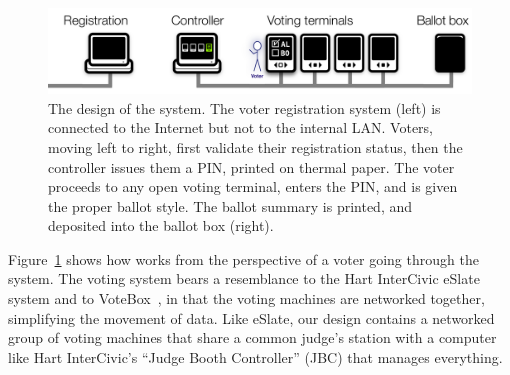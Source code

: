 \label{sec:voterflow}

\begin{figure}
\includegraphics[width=5.5in]{system-layout}
\caption{The design of the \projname system. The voter registration
  system (left) is connected to the Internet but not to the internal
  LAN. Voters, moving left to right, first validate their registration
  status, then the controller issues them a PIN, printed on thermal
  paper. The voter proceeds to any open voting terminal, enters the
  PIN, and is given the proper ballot style. The ballot summary is
  printed, and deposited into the ballot box
  (right). \label{fig:design}}

\end{figure}

Figure~\ref{fig:design} shows how \projname works from the perspective
of a voter going through the system. 
The \projname voting system bears a resemblance to the Hart InterCivic eSlate system and to VoteBox~\cite{sandler08votebox}, in that the voting machines are networked together, 
simplifying the movement of data. 
Like eSlate, our design contains a networked group of voting machines that share a common judge's station with a computer like Hart InterCivic's ``Judge Booth Controller'' (JBC) that manages everything. 

